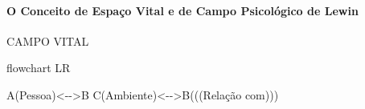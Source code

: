\documentclass[
]{book}
\newenvironment{Shaded}{\begin{snugshade}}{\end{snugshade}}
\newcommand{\NormalTok}[1]{#1}
\begin{document}
\hypertarget{o-conceito-de-espauxe7o-vital-e-de-campo-psicoluxf3gico-de-lewin}{%
\paragraph{\texorpdfstring{O Conceito de \textbf{Espaço Vital} e de
\textbf{Campo Psicológico} de
Lewin}{O Conceito de Espaço Vital e de Campo Psicológico de Lewin}}\label{o-conceito-de-espauxe7o-vital-e-de-campo-psicoluxf3gico-de-lewin}}

CAMPO VITAL

\begin{Shaded}
\begin{Highlighting}[]
\NormalTok{flowchart LR}

\NormalTok{A(Pessoa)\textless{}{-}{-}\textgreater{}B}
\NormalTok{C(Ambiente)\textless{}{-}{-}\textgreater{}B(((Relação com)))}
\end{Highlighting}
\end{Shaded}
\end{document}
